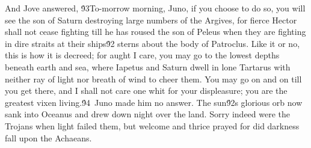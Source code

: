 {And Jove answered, \'93To-morrow morning, Juno, if you choose to do so, you will see the son of Saturn destroying large numbers of the Argives, for fierce Hector shall not cease fighting till he has roused the son of Peleus when they are fighting in dire straits at their ships\'92 sterns about the body of Patroclus. Like it or no, this is how it is decreed; for aught I care, you may go to the lowest depths beneath earth and sea, where Iapetus and Saturn dwell in lone Tartarus with neither ray of light nor breath of wind to cheer them. You may go on and on till you get there, and I shall not care one whit for your displeasure; you are the greatest vixen living.\'94\
Juno made him no answer. The sun\'92s glorious orb now sank into Oceanus and drew down night over the land. Sorry indeed were the Trojans when light failed them, but welcome and thrice prayed for did darkness fall upon the Achaeans.\
}
